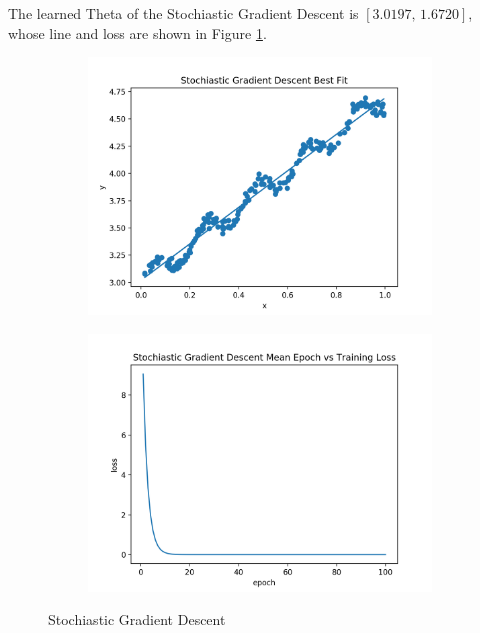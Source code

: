 \documentclass[11pt]{article}
\begin{document}
\begin{enumerate}
The learned Theta of the Stochiastic Gradient Descent is $[3.0197,\, 1.6720]$, whose line and loss are shown in Figure \ref{fig:sgd}.


\begin{figure}[!h]
    \centering
    \begin{subfigure}[b]{0.4\linewidth}
      \includegraphics[width=\linewidth]{figures/sgd.png}
    \end{subfigure}
    \begin{subfigure}[b]{0.4\linewidth}
      \includegraphics[width=\linewidth]{figures/sgd_loss.png}
    \end{subfigure}
    \caption{Stochiastic Gradient Descent}
    \label{fig:sgd}
\end{figure}


\end{enumerate}
\end{document}
